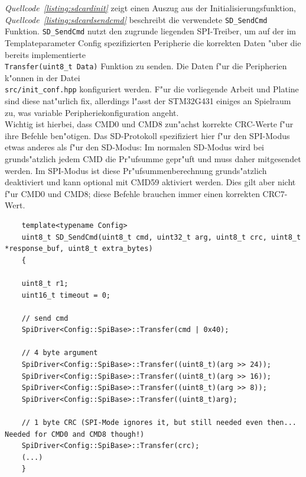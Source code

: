 \documentclass[11pt]{article}
\newcommand*{\coderef}[1]{\textit{Quellcode~\ref{#1}}}
\newcommand{\cpp}[1]{\texttt{#1}}
\begin{document}
\coderef{listing:sdcardinit} zeigt einen Auszug aus der Initialisierungsfunktion,
\coderef{listing:sdcardsendcmd} beschreibt die verwendete \cpp{SD_SendCmd} Funktion.
\cpp{SD_SendCmd} nutzt den zugrunde liegenden SPI-Treiber, um auf der im Templateparameter Config
spezifizierten Peripherie die korrekten Daten "uber
die bereits implementierte \\
\cpp{Transfer(uint8_t Data)} Funktion zu senden.
Die Daten f"ur die Peripherien k"onnen in der Datei \\
\texttt{src/init\_conf.hpp} konfiguriert werden.
F"ur die vorliegende Arbeit und Platine sind diese nat"urlich fix, allerdings l"asst der 
STM32G431 einiges an Spielraum zu, was variable Peripheriekonfiguration angeht.\\
Wichtig ist hierbei, dass CMD0 und CMD8 zun"achst korrekte CRC-Werte f"ur ihre Befehle
ben"otigen. Das SD-Protokoll spezifiziert hier f"ur den SPI-Modus etwas anderes als
f"ur den SD-Modus: Im normalen SD-Modus wird bei grunds"atzlich jedem CMD die Pr"ufsumme
gepr"uft und muss daher mitgesendet werden. Im SPI-Modus ist diese Pr"ufsummenberechnung
grunds"atzlich deaktiviert und kann optional mit CMD59 aktiviert werden. Dies gilt
aber nicht f"ur CMD0 und CMD8; diese Befehle brauchen immer einen korrekten CRC7-Wert.
\begin{listing}[H]
    \begin{verbatim}
    template<typename Config>
    uint8_t SD_SendCmd(uint8_t cmd, uint32_t arg, uint8_t crc, uint8_t *response_buf, uint8_t extra_bytes)
    {

    uint8_t r1;
    uint16_t timeout = 0;

    // send cmd
    SpiDriver<Config::SpiBase>::Transfer(cmd | 0x40);
    
    // 4 byte argument
    SpiDriver<Config::SpiBase>::Transfer((uint8_t)(arg >> 24));
    SpiDriver<Config::SpiBase>::Transfer((uint8_t)(arg >> 16));
    SpiDriver<Config::SpiBase>::Transfer((uint8_t)(arg >> 8));
    SpiDriver<Config::SpiBase>::Transfer((uint8_t)arg);
    
    // 1 byte CRC (SPI-Mode ignores it, but still needed even then... Needed for CMD0 and CMD8 though!)
    SpiDriver<Config::SpiBase>::Transfer(crc);
    (...)
    }
    \end{verbatim}
\caption{Auszug aus der Funktion \cpp{SD_SendCmd}}
\label{listing:sdcardsendcmd}
\end{listing}
\end{document}
